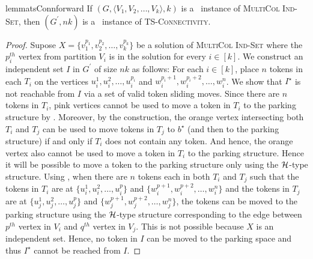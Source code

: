 \begin{restatable}{lemma}{tsConnforward}
\label{lemma:forward-reduction-leafage}
If $(G,\langle V_1,V_2,\ldots,V_k\rangle, k)$ is a \yes\ instance of \textsc{MultiCol Ind-Set},
then $(G^\prime,nk)$ is a \no\ instance of \textsc{TS-Connectivity}.
\end{restatable}
\begin{proof}
Supose $X=\{v_1^{p_1},v_2^{p_2},\ldots,v_k^{p_k}\}$ be a solution of 
\textsc{MultiCol Ind-Set} where the $p_i^{th}$ vertex from 
partition $V_i$ is in the solution for every $i\in [k]$. 
We construct an independent set $I$ in $G^\prime$ of size 
$nk$ as follows:
For each $i \in [k]$, place $n$ tokens in each $T_i$ on the vertices 
$u_i^1,u_i^2,\ldots,u_i^{p_i}$ and $w_i^{p_i+1},w_i^{p_i+2},\ldots,w_i^n$. 
We show that $I^\star$ is not reachable from $I$ via a set 
of valid token sliding moves.
Since there are $n$ tokens in $T_i$, pink vertices cannot 
be used to move a token in $T_i$ to the parking structure by 
.
Moreover, by the construction, the orange vertex intersecting both 
$T_i$ and $T_j$ can be used to move tokens in $T_j$ to $b^{\star}$
(and then to the parking structure) if and only if 
$T_i$ does not contain any token.
And hence, the orange vertex also cannot be used 
to move a token in $T_i$ to the parking structure.
Hence it will be possible to move a token to the parking structure 
only using the ${\mathcal H}$-type structure. 
Using , when there are $n$ tokens each in both 
$T_i$ and $T_j$ such that the tokens in $T_i$ are at 
$\{u_i^1,u_i^2,\ldots,u_i^p\}$ and 
$\{w_i^{p+1},w_i^{p+2},\ldots,w_i^n\}$ and 
the tokens in $T_j$ are at $\{u_j^1,u_j^2,\ldots,u_j^p\}$ and 
$\{w_j^{p+1},w_j^{p+2},\ldots,w_j^n\}$, 
the tokens can be moved to the parking structure using 
the ${\mathcal H}$-type structure corresponding to the edge between $p^{th}$ 
vertex in $V_i$ and $q^{th}$ vertex in $V_j$. 
This is not possible because $X$ is an independent set.
Hence, no token in $I$ can be moved to the parking space and thus 
$I^\star$ cannot be reached from $I$.
\end{proof}


